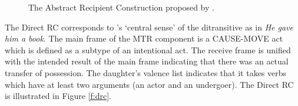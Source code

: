 \begin{figure}[t]
\caption{The Abstract Recipient Construction proposed by \citet{kay05argument}.}
\label{f:arc}
\end{figure}

The Direct RC corresponds to \citet{goldberg95construction}'s `central sense' of the ditransitive as in {\em He gave him a book}. The main frame of the MTR component is a CAUSE-MOVE act which is defined as a subtype of an intentional act. The receive frame is unified with the intended result of the main frame indicating that there was an actual transfer of possession. The daughter's valence list indicates that it takes verbs which have at least two arguments (an actor and an undergoer). The Direct RC is illustrated in Figure \ref{f:drc}.

